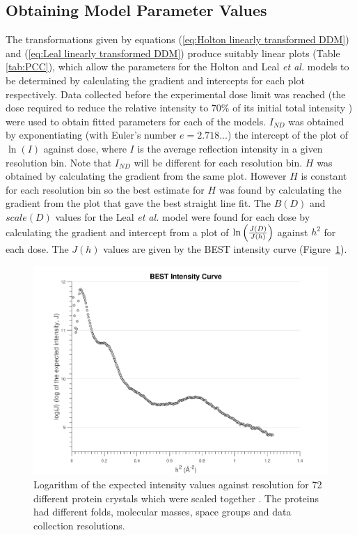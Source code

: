 \subsection{Obtaining Model Parameter Values}
\label{sub:Obtaining Model Parameter Values}
The transformations given by equations (\ref{eq:Holton linearly transformed DDM}) and (\ref{eq:Leal linearly transformed DDM}) produce suitably linear plots (Table \ref{tab:PCC}), which allow the parameters for the Holton and Leal \emph{et al.} models to be determined by calculating the gradient and intercepts for each plot respectively.
Data collected before the experimental dose limit was reached (the dose required to reduce the relative intensity to $70\%$ of its initial total intensity \cite{owen2006}) were used to obtain fitted parameters for each of the models.
$I_{ND}$ was obtained by exponentiating (with Euler's number $e = 2.718...$) the intercept of the plot of $\ln(I)$ against dose, where $I$ is the average reflection intensity in a given resolution bin.
Note that $I_{ND}$ will be different for each resolution bin.
$H$ was obtained by calculating the gradient from the same plot.
However $H$ is constant for each resolution bin so the best estimate for $H$ was found by calculating the gradient from the plot that gave the best straight line fit.
\newline
The $B(D)$ and $scale(D)$ values for the Leal \emph{et al.} model were found for each dose by calculating the gradient and intercept from a plot of $\ln \left(\frac{J(D)}{J(h)}\right)$ against $h^2$ for each dose.
The $J(h)$ values are given by the BEST intensity curve \cite{popov2003} (Figure~\ref{fig:BEST curve}).
\begin{figure}
    \centering
    \includegraphics[width=1\textwidth]{figures/dwd/bestcurve.pdf}
    \caption{Logarithm of the expected intensity values against resolution for 72 different protein crystals which were scaled together \cite{popov2003}. The proteins had different folds, molecular masses, space groups and data collection resolutions.}
    \label{fig:BEST curve}
\end{figure}
